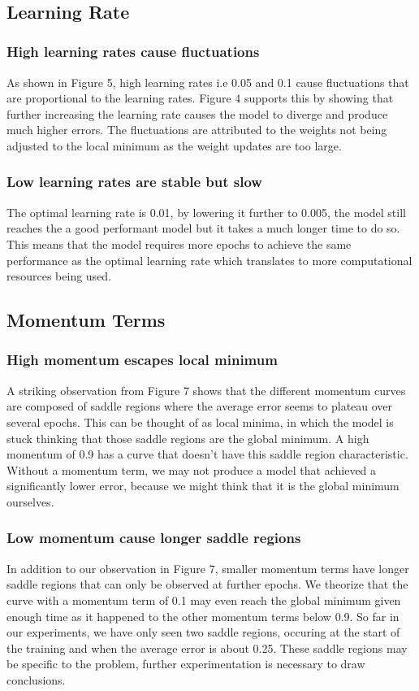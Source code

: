 \documentclass{acm_proc_article-sp}
\begin{document}
~\\

\subsection{Learning Rate}
\subsubsection{High learning rates cause fluctuations}
As shown in Figure 5, high learning rates i.e 0.05 and 0.1 cause fluctuations that are proportional to the learning rates. Figure 4 supports this by showing that further increasing the learning rate causes the model to diverge and produce much higher errors. The fluctuations are attributed to the weights not being adjusted to the local minimum as the weight updates are too large.
\subsubsection{Low learning rates are stable but slow}
The optimal learning rate is 0.01, by lowering it further to 0.005, the model still reaches the a good performant model but it takes a much longer time to do so. This means that the model requires more epochs to achieve the same performance as the optimal learning rate which translates to more computational resources being used.
\subsection{Momentum Terms}
\subsubsection{High momentum escapes local minimum}
A striking observation from Figure 7 shows that the different momentum curves are composed of saddle regions where the average error seems to plateau over several epochs. This can be thought of as local minima, in which the model is stuck thinking that those saddle regions are the global minimum. A high momentum of 0.9 has a curve that doesn't have this saddle region characteristic. Without a momentum term, we may not produce a model that achieved a significantly lower error, because we might think that it is the global minimum ourselves.
\subsubsection{Low momentum cause longer saddle regions}
In addition to our observation in Figure 7, smaller momentum terms have longer saddle regions that can only be observed at further epochs. We theorize that the curve with a momentum term of 0.1 may even reach the global minimum given enough time as it happened to the other momentum terms below 0.9. So far in our experiments, we have only seen two saddle regions, occuring at the start of the training and when the average error is about 0.25. These saddle regions may be specific to the problem, further experimentation is necessary to draw conclusions.
\end{document}
